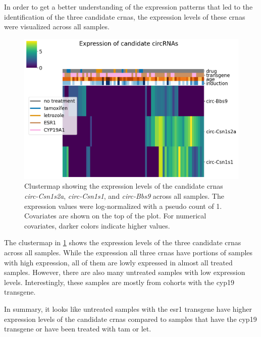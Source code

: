 In order to get a better understanding of the expression patterns that led to
the identification of the three candidate \glspl{crna}, the expression levels
of these \glspl{crna} were visualized across all samples.

\begin{figure}[H] \centering

    \includegraphics[width=\textwidth]{chapters/4_results_and_discussion/figures/heatmap.png}
    \caption{Clustermap showing the expression levels of the candidate
        \glspl{crna} \textit{circ-Csn1s2a}, \textit{circ-Csn1s1}, and
        \textit{circ-Bbs9} across all samples.
        The expression values were log-normalized with a pseudo count of 1.
        Covariates are shown on the top of the plot.
        For numerical covariates, darker colors indicate higher values.
    }
    \label{fig:candidate_heatmap}
\end{figure}

The clustermap in \cref{fig:candidate_heatmap} shows the expression levels of
the three candidate \glspl{crna} across all samples.
While the expression all three \glspl{crna} have portions of samples with high
expression, all of them are lowly expressed in almost all treated samples.
However, there are also many untreated samples with low expression levels.
Interestingly, these samples are mostly from cohorts with the \gls{cyp19}
transgene.

In summary, it looks like untreated samples with the \gls{esr1} transgene have
higher expression levels of the candidate \glspl{crna} compared to samples that
have the \gls{cyp19} transgene or have been treated with \gls{tam} or
\gls{let}.
